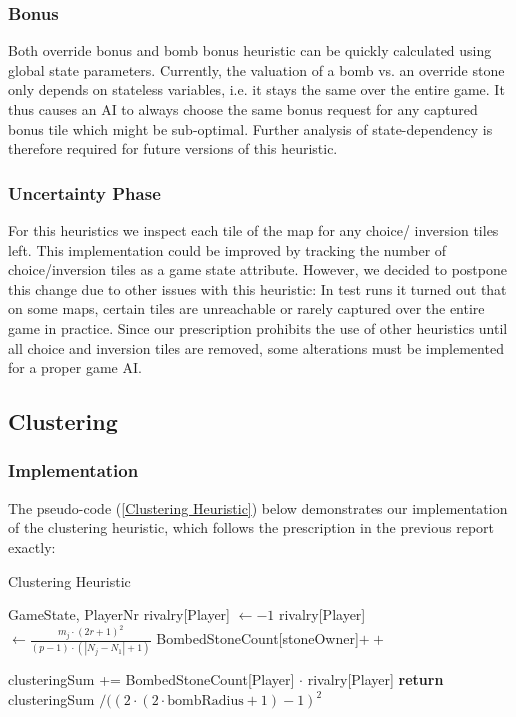 \documentclass[a4paper,12pt]{article}
\begin{document}
    \subsubsection{Bonus}
    Both override bonus and bomb bonus heuristic can be quickly calculated using global state parameters. Currently, the valuation of a bomb vs. an override stone only depends on stateless variables, i.e. it stays the same over the entire game. It thus causes an AI to always choose the same bonus request for any captured bonus tile which might be sub-optimal. Further analysis of state-dependency is therefore required for future versions of this heuristic. 
    \subsubsection{Uncertainty Phase}
    For this heuristics we inspect each tile of the map for any choice/ inversion tiles left. This implementation could be improved by tracking the number of choice/inversion tiles as a game state attribute. However, we decided to postpone this change due to other issues with this heuristic: In test runs it turned out that on some maps, certain tiles are unreachable or rarely captured over the entire game in practice. Since our prescription prohibits the use of other heuristics until all choice and inversion tiles are removed, some alterations must be implemented for a proper game AI. 
    
    \subsection{Clustering}
    \subsubsection{Implementation}
    The pseudo-code (\ref{Clustering Heuristic}) below demonstrates our implementation of the clustering heuristic, which follows the prescription in the previous report exactly:
    \begin{algorithm}[H]
        \caption{Clustering Heuristic}\label{Clustering Heuristic}
        \begin{algorithmic}
            \Require GameState, PlayerNr
            \State rivalry[Player] $\gets -1$
            \Else
            \State rivalry[Player] $\gets \frac{m_j \cdot (2r+1)^2}{(p-1) \cdot (|N_j - N_1| + 1)}$
            \EndIf
            \EndFor
            \Statex
            \State BombedStoneCount[stoneOwner]$++$
            \EndFor
            
            \State clusteringSum += BombedStoneCount[Player] $\cdot$ rivalry[Player] 
            \EndFor
            \EndFor
            \Statex
            \State \textbf{return} clusteringSum $\slash ((2 \cdot (2 \cdot \text{bombRadius} + 1) - 1)^2$
            \EndFunction
        \end{algorithmic}
    \end{algorithm}
\end{document}
